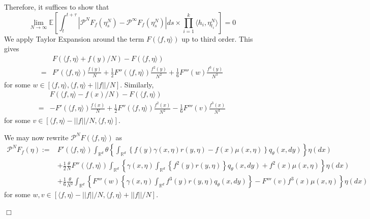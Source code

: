 \documentclass[12pt]{article}
\newenvironment {proof}{{\noindent\bf Proof }}{\hfill $\Box$ \medskip}
\newcommand{\Pgen}{\mathcal{P}}    %
\begin{document}
\begin{proof}
Therefore, it suffices to show that 
\begin{equation}
    \label{eq: Convergence of Spatial Generator}
\lim_{N \to \infty}
\mathbb{E}\left[
\int_{t}^{t+\tau}
\left|
\Pgen^{N}F_f(\eta^{N}_s)
-\Pgen^{\infty}F_f(\eta^{N}_s)
\right|
ds
\times 
\prod_{i=1}^{k}\langle h_i,\eta^{N}_{t_i} \rangle
\right]=0
\end{equation}
We apply Taylor Expansion
around the term $F(\langle f, \eta \rangle )$
up to third order.
This gives
\begin{equation}
    \label{eq: Taylor Expansion calculations i}
\begin{aligned}
&F(\langle f, \eta \rangle + f(y)/N )-F(\langle f, \eta \rangle )\\
=& F'(\langle f, \eta \rangle ) \frac{f(y)}{N}
+\frac{1}{2}F''(\langle f, \eta \rangle ) \frac{f^2(y)}{N^2}
+\frac{1}{6}F'''(w ) \frac{f^3(y)}{N^3}
\end{aligned}
\end{equation}
for some $w \in [\langle f, \eta \rangle, \langle f, \eta \rangle+ ||f||/N]$.
Similarly,
\begin{equation}
    \label{eq: Taylor Expansion calculations ii}
\begin{aligned}
&F(\langle f, \eta \rangle - f(x)/N )-F(\langle f, \eta \rangle )\\
=& - F'(\langle f, \eta \rangle ) \frac{f(x)}{N}
+\frac{1}{2}F''(\langle f, \eta \rangle ) \frac{f^2(x)}{N^2}
-\frac{1}{6}F'''(v ) \frac{f^3(x)}{N^3}
\end{aligned}
\end{equation}
for some $v \in [\langle f, \eta \rangle - ||f||/N, \langle f, \eta \rangle ]$.

We may now rewrite $\mathcal{P}^NF(\langle f, \eta \rangle)$ as 
\small
\begin{equation} 
    \label{eq: Pre-Limit Generator Expanded}
\begin{aligned}
\Pgen^{N} F_f(\eta):=& F'(\langle f, \eta \rangle)\int_{\mathbb{R}^d}  \theta\left\{\int_{\mathbb{R}^d} \left\{f(y)\gamma(x, \eta) r(y,\eta) -f(x)\mu(x, \eta)\right\}q_{\theta}(x,dy)\right\}\eta(dx)\\
&+\frac{1}{2}\frac{\theta}{N}F''(\langle f, \eta \rangle)\int_{\mathbb{R}^d} 
 \left\{\gamma(x, \eta)\int_{\mathbb{R}^d} \left\{f^2(y) r(y,\eta) \right\}q_{\theta}(x,dy)+f^2(x)\mu(x, \eta)\right\}\eta(dx)\\
&+\frac{1}{6}\frac{\theta}{N^2}\int_{\mathbb{R}^d}\left\{ 
F'''(w) \left\{\gamma(x, \eta)\int_{\mathbb{R}^d} f^3(y) r(y,\eta) q_{\theta}(x,dy)\right\}-F'''(v)f^3(x)\mu(x, \eta)\right\}\eta(dx)
\end{aligned}    
\end{equation}
\normalsize
for some $w,v \in [\langle f,\eta \rangle - ||f||/N, \langle f,\eta \rangle + ||f||/N]$.


\end{proof}
\end{document}
